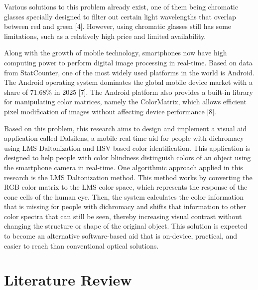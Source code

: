 Various solutions to this problem already exist, one of them being chromatic glasses specially designed to filter out certain light wavelengths that overlap between red and green [4]. However, using chromatic glasses still has some limitations, such as a relatively high price and limited availability.

Along with the growth of mobile technology, smartphones now have high computing power to perform digital image processing in real-time. Based on data from StatCounter, one of the most widely used platforms in the world is Android. The Android operating system dominates the global mobile device market with a share of 71.68\% in 2025 [7]. The Android platform also provides a built-in library for manipulating color matrices, namely the ColorMatrix, which allows efficient pixel modification of images without affecting device performance [8].

Based on this problem, this research aims to design and implement a visual aid application called Dalsilens, a mobile real-time aid for people with dichromacy using LMS Daltonization and HSV-based color identification. This application is designed to help people with color blindness distinguish colors of an object using the smartphone camera in real-time. One algorithmic approach applied in this research is the LMS Daltonization method. This method works by converting the RGB color matrix to the LMS color space, which represents the response of the cone cells of the human eye. Then, the system calculates the color information that is missing for people with dichromacy and shifts that information to other color spectra that can still be seen, thereby increasing visual contrast without changing the structure or shape of the original object. This solution is expected to become an alternative software-based aid that is on-device, practical, and easier to reach than conventional optical solutions.

\section{Literature Review}


